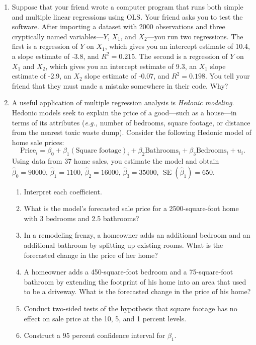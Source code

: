 \documentclass[11pt]{article}
\begin{document}
\begin{onehalfspacing}
\begin{enumerate}
\item Suppose that your friend wrote a computer program that runs both simple and multiple linear regressions using OLS. Your friend asks you to test the software. After importing a dataset with 2000 observations and three cryptically named variables---$Y$, $X_1$, and $X_2$---you run two regressions. The first is a regression of $Y$ on $X_1$, which gives you an intercept estimate of 10.4, a slope estimate of -3.8, and $R^2 = 0.215$. The second is a regression of $Y$ on $X_1$ and $X_2$, which gives you an intercept estimate of 9.3, an $X_1$ slope estimate of -2.9, an $X_2$ slope estimate of -0.07, and $R^2 = 0.198$. You tell your friend that they must made a mistake somewhere in their code. Why?

\item A useful application of multiple regression analysis is \textit{Hedonic modeling}. Hedonic models seek to explain the price of a good---such as a house---in terms of its attributes (\textit{e.g.,} number of bedrooms, square footage, or distance from the nearest toxic waste dump). Consider the following Hedonic model of home sale prices:
$$\text{Price}_i = \beta_0 + \beta_1 (\text{Square footage})_i + \beta_2 \text{Bathrooms}_i  + \beta_3 \text{Bedrooms}_i + u_i.$$
Using data from 37 home sales, you estimate the model and obtain $\hat{\beta}_0 = 90000$, $\hat{\beta}_1 = 1100$, $\hat{\beta}_2 = 16000$, $\hat{\beta}_3 = 35000$, $\mathop{\text{SE}}(\hat{\beta}_1) = 650$.

\begin{enumerate}
	\item Interpret each coefficient.
	\item What is the model's forecasted sale price for a 2500-square-foot home with 3 bedrooms and 2.5 bathrooms?
	\item In a remodeling frenzy, a homeowner adds an additional bedroom and an additional bathroom by splitting up existing rooms. What is the forecasted change in the price of her home?
	\item A homeowner adds a 450-square-foot bedroom and a 75-square-foot bathroom by extending the footprint of his home into an area that used to be a driveway. What is the forecasted change in the price of his home? 
	\item Conduct two-sided tests of the hypothesis that square footage has no effect on sale price at the 10, 5, and 1 percent levels.
	\item  Construct a 95 percent confidence interval for $\beta_1$.


\end{enumerate}
\end{enumerate}
\end{onehalfspacing}
\end{document}
